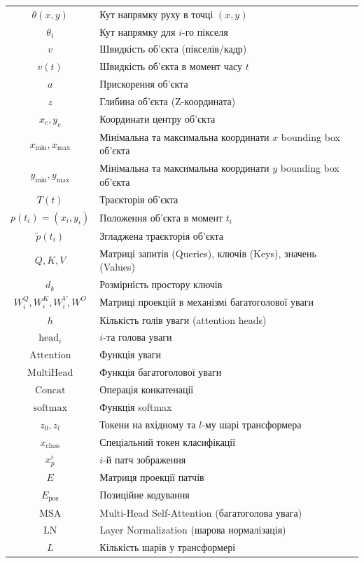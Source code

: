 \documentclass[14pt, a4paper]{extarticle}
\numberwithin{equation}{section}
\begin{document}
\begin{longtable}{|c|l|}
$\theta(x,y)$ & Кут напрямку руху в точці $(x,y)$ \\
$\theta_i$ & Кут напрямку для $i$-го пікселя \\
$v$ & Швидкість об'єкта (пікселів/кадр) \\
$v(t)$ & Швидкість об'єкта в момент часу $t$ \\
$a$ & Прискорення об'єкта \\
$z$ & Глибина об'єкта (Z-координата) \\
$x_c, y_c$ & Координати центру об'єкта \\
$x_{\min}, x_{\max}$ & Мінімальна та максимальна координати $x$ bounding box об'єкта \\
$y_{\min}, y_{\max}$ & Мінімальна та максимальна координати $y$ bounding box об'єкта \\
$T(t)$ & Траєкторія об'єкта \\
$p(t_i) = (x_i, y_i)$ & Положення об'єкта в момент $t_i$ \\
$\tilde{p}(t_i)$ & Згладжена траєкторія об'єкта \\
$Q, K, V$ & Матриці запитів (Queries), ключів (Keys), значень (Values) \\
$d_k$ & Розмірність простору ключів \\
$W_i^Q, W_i^K, W_i^V, W^O$ & Матриці проекцій в механізмі багатоголової уваги \\
$h$ & Кількість голів уваги (attention heads) \\
$\text{head}_i$ & $i$-та голова уваги \\
$\text{Attention}$ & Функція уваги \\
$\text{MultiHead}$ & Функція багатоголової уваги \\
$\text{Concat}$ & Операція конкатенації \\
$\text{softmax}$ & Функція softmax \\
$z_0, z_l$ & Токени на вхідному та $l$-му шарі трансформера \\
$x_{\text{class}}$ & Спеціальний токен класифікації \\
$x_p^i$ & $i$-й патч зображення \\
$E$ & Матриця проекції патчів \\
$E_{\text{pos}}$ & Позиційне кодування \\
$\text{MSA}$ & Multi-Head Self-Attention (багатоголова увага) \\
$\text{LN}$ & Layer Normalization (шарова нормалізація) \\
$L$ & Кількість шарів у трансформері \\

\end{longtable}
\end{document}
